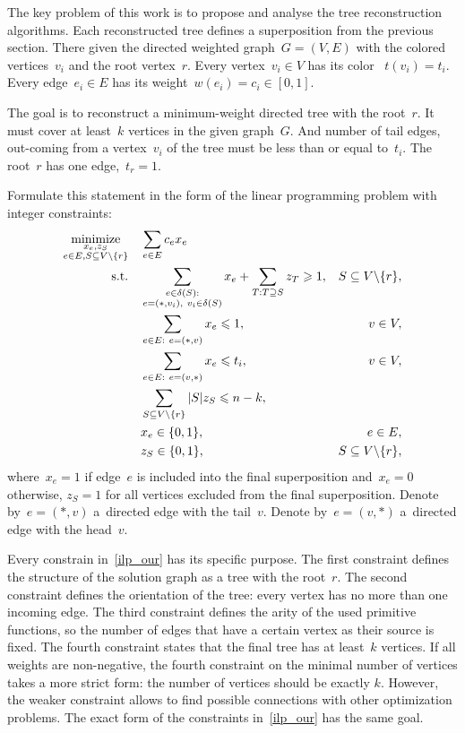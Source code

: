 \documentclass[12pt]{article}
\begin{document}
The key problem of this work is to propose and analyse the tree reconstruction algorithms. Each reconstructed tree defines a superposition from the previous section. There given the directed weighted graph~$G=(V,E)$ with the colored vertices~$v_i$ and the root vertex~$r$. Every vertex~$v_i \in V$ has its color ~$t(v_i)=t_i$. Every edge~$e_i\in E$ has its weight~\mbox{$w(e_i)=c_i\in[0,1]$}.


The goal is to reconstruct a minimum-weight directed tree with the root~$r$. It must cover at least~$k$ vertices in the given graph~$G$. And number of tail edges, out-coming from a vertex~$v_i$ of the tree must be less than or equal to~$t_i$. The root~$r$ has one edge,~$t_r=1$.


Formulate this statement in the form of the linear programming problem with integer constraints:
\begin{align}
\underset{\substack{x_e, z_S \\ e\in E, S\subseteq V\backslash \{r\}}}{\text{minimize}}\quad & \sum\limits_{e\in E}c_ex_e \nonumber\\
\text{s.t.\quad} & \sum\limits_{\substack{e\in\delta(S):\\e=(\ast,v_i),~ v_i\in\delta(S)}}x_e + \sum\limits_{T:T\supseteq S}z_T\geqslant 1, & S\subseteq V\backslash \{r\},\nonumber\\
& \sum\limits_{e\in E:~e=(\ast,v)}x_e\leqslant 1, & v\in V,
\label{ilp_our}\\
& \sum\limits_{e\in E:~e=(v,\ast)}x_e\leqslant t_i, & v\in V,\nonumber\\
& \sum\limits_{S\subseteq V\backslash \{r\}}|S|z_S \leqslant n-k,\nonumber\\
& x_e\in\{0,1\}, & e\in E,\nonumber\\
& z_S\in\{0,1\}, & S\subseteq V\backslash \{r\},\nonumber
\end{align}
where~$x_e = 1$ if edge~$e$ is included into the final superposition and~$x_e = 0$ otherwise, $z_S = 1$ for all vertices excluded from the final superposition. Denote by~$e=(\ast, v)$ a~directed edge with the tail~$v$. Denote by~$e=(v, \ast)$  a~directed edge with the head~$v$.


Every constrain in~\eqref{ilp_our} has its specific purpose.
The first constraint defines the structure of the solution graph as a tree with the root~$r$.
The second constraint defines the orientation of the tree: every vertex has no more than one incoming edge.
The third constraint defines the arity of the used primitive functions, so the number of edges that have a certain vertex as their source is fixed.
The fourth constraint states that the final tree has at least~$k$ vertices. If all weights are non-negative, the fourth constraint on the minimal number of vertices takes a more strict form: the number of vertices should be exactly $k$. However, the weaker constraint allows to find possible connections with other optimization problems. The exact form of the constraints in~\eqref{ilp_our} has the same goal.
\end{document}
